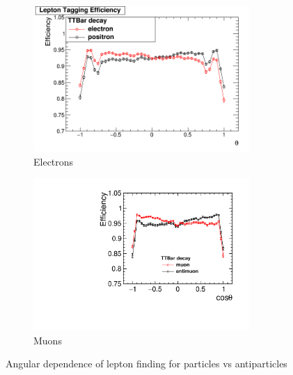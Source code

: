 \begin{figure}
  \centering
  \begin{subfigure}{.5\textwidth}
    \centering
    \includegraphics[width=0.9\textwidth]{figures/ElectronEfficiencys.png}
    \caption[Charge Tagging Efficiency]{Electrons}
    \label{fig:electronefficiency}
  \end{subfigure}%
  \begin{subfigure}{.5\textwidth}
    \centering
    \includegraphics[width=0.9\textwidth]{figures/MuonEfficiencys}
    \caption[Charge Tagging Efficiency]{Muons}
    \label{fig:muonefficiency}
  \end{subfigure}
  \caption{Angular dependence of lepton finding for particles vs antiparticles}
  \label{fig:chargeEfficiencies}
\end{figure}


